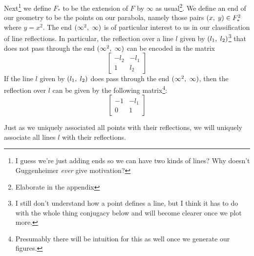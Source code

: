 \documentclass[12pt]{article}
\newcommand{\ttc}{, \hspace{1mm}}
\newcommand{\linenoendmat}[2]{\begin{bmatrix} -{#2} & -{#1} \\ 1 & {#2} \end{bmatrix}}
\newcommand{\stanlinenoendmat}{\linenoendmat{l_1}{l_2}}
\newcommand{\lineendmat}[2]{\begin{bmatrix} -1 & -{#1} \\ 0 & 1 \end{bmatrix}}
\newcommand{\stanlineendmat}{\lineendmat{l_1}{l_2}}
\newcommand{\specialend}{(\infty^2\ttc\infty)}
\theoremstyle{plain}
\theoremstyle{definition}
\begin{document}
Next\footnote{I guess we're just adding ends so we can have two kinds of lines? Why doesn't Guggenheimer \textit{ever} give motivation?} we define $F_*$ to be the extension of $F$ by $\infty$ as usual\footnote{Elaborate in the appendix}. We define an end of our geometry to be the points on our parabola, namely those pairs $(x \ttc y) \in F_*^2$ where $y = x^2$. The end $\specialend$ is of particular interest to us in our classification of line reflections. In particular, the reflection over a line $l$ given by $(l_1\ttc l_2)$\footnote{I still don't understand how a point defines a line, but I think it has to do with the whole thing conjugacy below and will become clearer once we plot more.} that does not pass through the end $\specialend$ can be encoded in the matrix
\[\stanlinenoendmat\]
If the line $l$ given by $(l_1\ttc l_2)$ does pass through the end $\specialend$, then the reflection over $l$ can be given by the following matrix\footnote{Presumably there will be intuition for this as well once we generate our figures.}:
\[
	\stanlineendmat
\]

Just as we uniquely associated all points with their reflections, we will uniquely associate all lines $l$ with their reflections.
\end{document}
